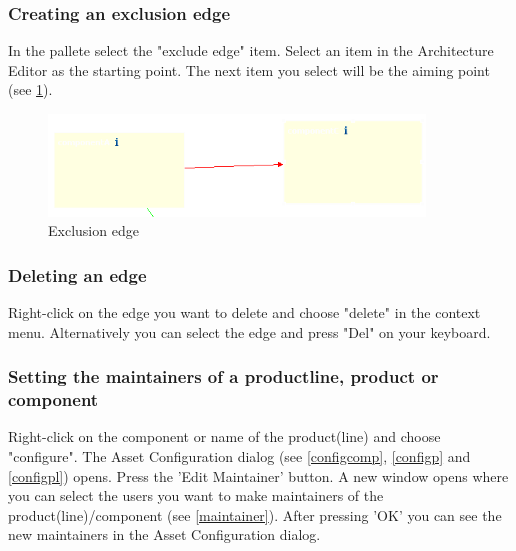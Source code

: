 \subsubsection{Creating an exclusion edge}

In the pallete select the "exclude edge" item. Select an item in the Architecture Editor
as the starting point. The next item you select will be the aiming point (see \ref{exclude}).

\begin{figure}[h!]
\begin{center}
\includegraphics[width=10cm]{exclude.png}
   \caption{Exclusion edge}
\label{exclude}
\end{center}
\end{figure}\par

\subsubsection{Deleting an edge}

Right-click on the edge you want to delete and choose "delete" in the context menu.
Alternatively you can select the edge and press "Del" on your keyboard.


\subsubsection{Setting the maintainers of a productline, product or component}
Right-click on the component or name of the product(line) and choose "configure". The Asset Configuration dialog (see \ref{configcomp}, \ref{configp} and \ref{configpl}) opens.
Press the 'Edit Maintainer' button. A new window opens where you can select the users you want to make maintainers of
the product(line)/component (see \ref{maintainer}). After pressing 'OK' you can see the new maintainers in the Asset Configuration
dialog.

